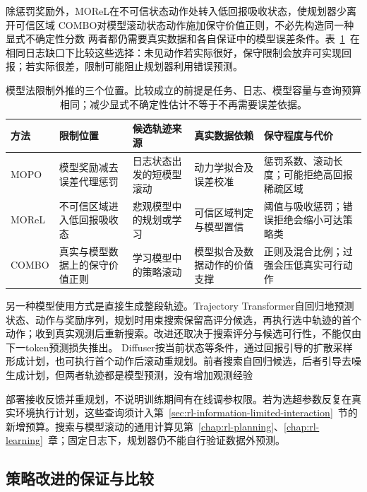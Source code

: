 除惩罚奖励外，MOReL在不可信状态动作处转入低回报吸收状态，使规划器少离开可信区域
COMBO对模型滚动状态动作施加保守价值正则，不必先构造同一种显式不确定性分数
两者都仍需要真实数据和各自保证中的模型误差条件。表~\ref{tab:rl-information-model-methods}~在相同日志缺口下比较这些选择：未见动作若实际很好，保守限制会放弃可实现回报；若实际很差，限制可能阻止规划器利用错误预测。

\begin{table}[t]
  \centering
  \small
  \begin{tabularx}{\linewidth}{p{17mm}XXXX}
    \toprule
    方法 & 限制位置 & 候选轨迹来源 & 真实数据依赖 & 保守程度与代价 \\
    \midrule
    MOPO & 模型奖励减去误差代理惩罚 & 日志状态出发的短模型滚动 & 动力学拟合及误差校准 & 惩罚系数、滚动长度；可能拒绝高回报稀疏区域 \\
    MOReL & 不可信区域进入低回报吸收态 & 悲观模型中的规划或学习 & 可信区域判定与模型置信 & 阈值与吸收惩罚；错误拒绝会缩小可达策略类 \\
    COMBO & 真实与模型数据上的保守价值正则 & 学习模型中的策略滚动 & 模型拟合及数据动作的价值支撑 & 正则及混合比例；过强会压低真实可行动作 \\
    \bottomrule
  \end{tabularx}
  \caption{模型法限制外推的三个位置。比较成立的前提是任务、日志、模型容量与查询预算相同；减少显式不确定性估计不等于不再需要误差依据。}
  \label{tab:rl-information-model-methods}
\end{table}

另一种模型使用方式是直接生成整段轨迹。Trajectory Transformer自回归地预测状态、动作与奖励序列，规划时用束搜索保留高评分候选，再执行选中轨迹的首个动作；收到真实观测后重新搜索。改进还取决于搜索评分与候选可行性，不能仅由下一token预测损失推出。
Diffuser按当前状态等条件，通过回报引导的扩散采样形成计划，也可执行首个动作后滚动重规划。前者搜索自回归候选，后者引导去噪生成计划，但两者轨迹都是模型预测，没有增加观测经验

部署接收反馈并重规划，不说明训练期间有在线调参权限。若为选超参数反复在真实环境执行计划，这些查询须计入第~\ref{sec:rl-information-limited-interaction}~节的新增预算。搜索与模型滚动的通用计算见第~\ref{chap:rl-planning}、\ref{chap:rl-learning}~章；固定日志下，规划器仍不能自行验证数据外预测。

\subsection{策略改进的保证与比较}
\label{sec:rl-information-improvement}

